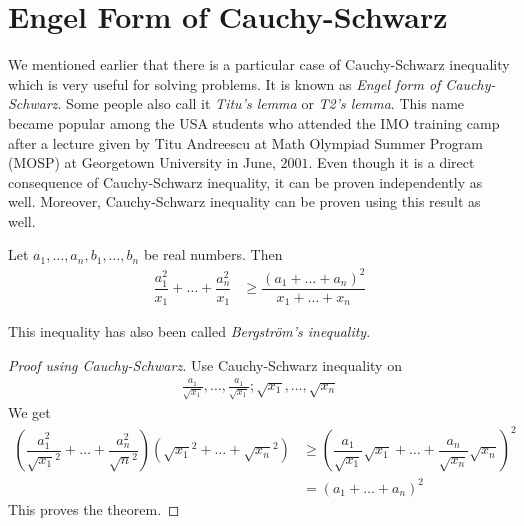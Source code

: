 \documentclass{subfile}
\begin{document}
	\chapter{Engel Form of Cauchy-Schwarz}\label{ch:engel}
	We mentioned earlier that there is a particular case of Cauchy-Schwarz inequality which is very useful for solving problems. It is known as \emph{Engel form of Cauchy-Schwarz}. Some people also call it \emph{Titu's lemma} or \emph{T2's lemma}. This name became popular among the USA students who attended the IMO training camp after a lecture given by Titu Andreescu at Math Olympiad Summer Program (MOSP) at Georgetown University in June, $2001$. Even though it is a direct consequence of Cauchy-Schwarz inequality, it can be proven independently as well. Moreover, Cauchy-Schwarz inequality can be proven using this result as well.
		\begin{theorem}\label{thm:engel}
			Let $a_1,\ldots,a_n,b_1,\ldots,b_n$ be real numbers. Then
				\begin{align}
					\dfrac{a_1^2}{x_1}+\ldots+\dfrac{a_n^2}{x_1}
						& \geq\dfrac{(a_1+\ldots+a_n)^2}{x_1+\ldots+x_n}\label{ineq:engel}
				\end{align}
		\end{theorem}
	This inequality has also been called \emph{Bergstr\"{o}m's inequality}. 
		\begin{proof}[Proof using Cauchy-Schwarz]
			Use Cauchy-Schwarz inequality on
				\begin{align*}
					\frac{a_1}{\sqrt{x_1}},\ldots,\frac{a_1}{\sqrt{x_1}};\sqrt{x_1},\ldots,\sqrt{x_n}
				\end{align*}
			We get
				\begin{align*}
					\left(\dfrac{a_1^2}{\sqrt{x_1}^2}+\ldots+\dfrac{a_n^2}{\sqrt{n}^2}\right)\left(\sqrt{x_1}^2+\ldots+\sqrt{x_n}^2\right)
						& \geq\left(\dfrac{a_1}{\sqrt{x_1}}\sqrt{x_1}+\ldots+\dfrac{a_n}{\sqrt{x_n}}\sqrt{x_n}\right)^2\\
						& = (a_1+\ldots+a_n)^2
				\end{align*}
			This proves the theorem.
		\end{proof}
	
\end{document}
